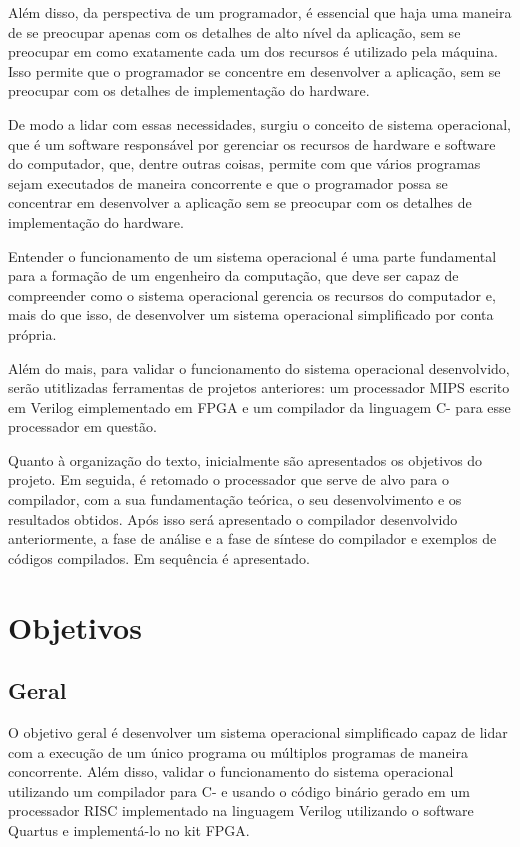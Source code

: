 \documentclass[
	12pt,				%
	oneside,
	a4paper,			%
	english,			%
	french,				%
	spanish,			%
	brazil,				%
	]{abntex2}
\begin{document}
Além disso, da perspectiva de um programador, é essencial que haja uma maneira de se preocupar apenas com os detalhes de alto nível da aplicação, sem se preocupar em como exatamente cada um dos recursos é utilizado pela máquina. Isso permite que o programador se concentre em desenvolver a aplicação, sem se preocupar com os detalhes de implementação do hardware.

De modo a lidar com essas necessidades, surgiu o conceito de sistema operacional, que é um software responsável por gerenciar os recursos de hardware e software do computador, que, dentre outras coisas, permite com que vários programas sejam executados de maneira concorrente e que o programador possa se concentrar em desenvolver a aplicação sem se preocupar com os detalhes de implementação do hardware.

Entender o funcionamento de um sistema operacional é uma parte fundamental para a formação de um engenheiro da computação, que deve ser capaz de compreender como o sistema operacional gerencia os recursos do computador e, mais do que isso, de desenvolver um sistema operacional simplificado por conta própria. 

Além do mais, para validar o funcionamento do sistema operacional desenvolvido, serão utitlizadas ferramentas de projetos anteriores: um processador MIPS escrito em Verilog eimplementado em FPGA e um compilador da linguagem C- para esse processador em questão.

Quanto à organização do texto, inicialmente são apresentados os objetivos do projeto. Em seguida, é retomado o processador que serve de alvo para o compilador, com a sua fundamentação teórica, o seu desenvolvimento e os resultados obtidos. Após isso será apresentado o compilador desenvolvido anteriormente, a fase de análise e a fase de síntese do compilador e exemplos de códigos compilados. Em sequência é apresentado.

\chapter[Objetivos]{Objetivos}
\section{Geral}
O objetivo geral é desenvolver um sistema operacional simplificado capaz de lidar com a execução de um único programa ou múltiplos programas de maneira concorrente. Além disso, validar o funcionamento do sistema operacional utilizando um compilador para C- e usando o código binário gerado em um processador RISC implementado na linguagem Verilog utilizando o software Quartus e implementá-lo no kit FPGA.
\end{document}
